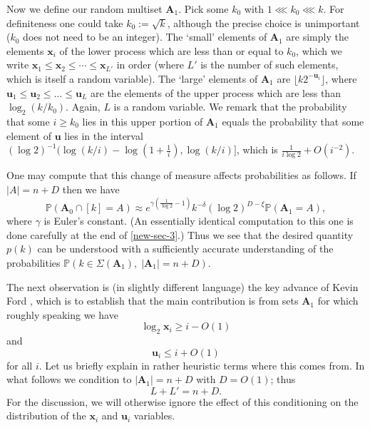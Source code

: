 \documentclass[11pt,reqno]{amsart}
\numberwithin{equation}{section}
\theoremstyle{definition}
\theoremstyle{remark}
\newcommand{\mb}{\mathbb}
\newcommand{\mbf}{\mathbf}
\renewcommand{\le}{\leqslant}
\renewcommand{\ge}{\geqslant}
\begin{document}
Now we define our random multiset $\mbf{A}_1$. Pick some $k_0$ with $1 \lll k_0 \lll k$. For definiteness one could take $k_0 := \sqrt{k}$, although the precise choice is unimportant ($k_0$ does not need to be an integer). The `small' elements of $\mbf{A}_1$ are simply the elements $\mbf{x}_i$ of the lower process which are less than or equal to $k_0$, which we write $\mbf{x}_1 \le \mbf{x}_2 \le \cdots \le \mbf{x}_{L'}$ in order (where $L'$ is the number of such elements, which is itself a random variable). The `large' elements of $\mbf{A}_1$ are $\lfloor k 2^{-\mbf{u}_i}\rfloor$, where $\mbf{u}_1 \le \mbf{u}_2 \le \dots \le \mbf{u}_L$ are the elements of the upper process which are less than $\log_2(k/k_0)$. Again, $L$ is a random variable. We remark that the probability that some $i \ge k_0$ lies in this upper portion of $\mbf{A}_1$ equals the probability that some element of $\mbf{u}$ lies in the interval $(\log 2)^{-1}\big( \log (k/i) - \log(1 + \frac{1}{i}) , \log (k/i)\big]$, which is $\frac{1}{i \log 2} + O(i^{-2})$.

One may compute that this change of measure affects probabilities as follows. If $|A| = n + D$ then we have
\begin{equation}\label{change-measure-result} \mb{P}(\mbf{A}_0 \cap [k] = A) \approx e^{\gamma(\frac{1}{\log 2} - 1)} k^{-\delta} (\log 2)^{D - \xi} \mb{P}(\mbf{A}_1  = A),\end{equation} where $\gamma$ is Euler's constant. (An essentially identical computation to this one is done carefully at the end of \cref{new-sec-3}.) Thus we see that the desired quantity $p(k)$ can be understood with a sufficiently accurate understanding of the probabilities $\mb{P}(k \in \Sigma(\mbf{A}_1), \; |\mbf{A}_1| = n + D)$.

The next observation is (in slightly different language) the key advance of Kevin Ford \cite{For08}, which is to establish that the main contribution is from sets $\mbf{A}_1$ for which roughly speaking we have
\begin{equation}\label{xi-rough-pos} \log_2 \mbf{x}_i \ge i - O(1)\end{equation}
and
\begin{equation}\label{yi-rough-pos} \mbf{u}_i \le i + O(1)\end{equation} for all $i$. Let us briefly explain in rather heuristic terms where this comes from. In what follows we condition to $|\mbf{A}_1| = n + D$ with $D = O(1)$; thus \[ L + L' = n + D.\] For the discussion, we will otherwise ignore the effect of this conditioning on the distribution of the $\mbf{x}_i$ and $\mbf{u}_i$ variables.
\end{document}
